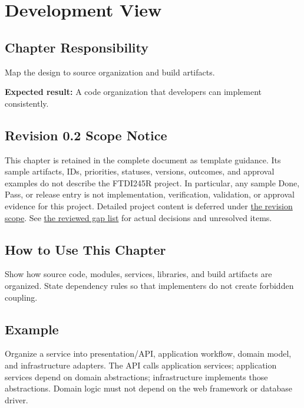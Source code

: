 \chapter{Development View}
\section{Chapter Responsibility}
\label{Section:DevelopmentViewResponsibility}
Map the design to source organization and build artifacts.

\noindent\textbf{Expected result:} A code organization that developers can implement consistently.

\section{Revision 0.2 Scope Notice}
\label{Section:DeferredDevelopmentView}
\begin{fsaNote}
This chapter is retained in the complete document as template guidance.
Its sample artifacts, IDs, priorities, statuses, versions, outcomes, and
approval examples do not describe the FTDI245R project. In particular, any
sample Done, Pass, or release entry is not implementation, verification,
validation, or approval evidence for this project. Detailed project content
is deferred under \hyperref[Section:ProjectScope]{the revision scope}.
See \hyperref[Table:ProjectGapReview]{the reviewed gap list} for actual
decisions and unresolved items.
\end{fsaNote}

\section{How to Use This Chapter}
Show how source code, modules, services, libraries, and build artifacts are organized. State dependency rules so that implementers do not create forbidden coupling.
\section{Example}
Organize a service into presentation/API, application workflow, domain model, and infrastructure adapters. The API calls application services; application services depend on domain abstractions; infrastructure implements those abstractions. Domain logic must not depend on the web framework or database driver.
